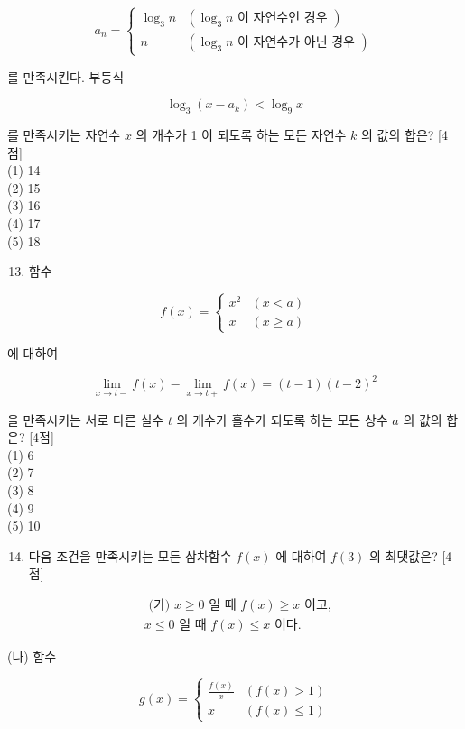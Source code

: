 \documentclass[10pt]{article}
\begin{document}
\[
a_{n}= \begin{cases}\log _{3} n & \left(\log _{3} n \text { 이 자연수인 경우 }\right) \\ n & \left(\log _{3} n \text { 이 자연수가 아닌 경우 }\right)\end{cases}
\]

를 만족시킨다. 부등식

\[
\log _{3}\left(x-a_{k}\right)<\log _{9} x
\]

를 만족시키는 자연수 $x$ 의 개수가 1 이 되도록 하는 모든 자연수 $k$ 의 값의 합은? [4점]\\
(1) 14\\
(2) 15\\
(3) 16\\
(4) 17\\
(5) 18

\begin{enumerate}
  \setcounter{enumi}{12}
  \item 함수
\end{enumerate}

\[
f(x)= \begin{cases}x^{2} & (x<a) \\ x & (x \geq a)\end{cases}
\]

에 대하여

\[
\lim _{x \rightarrow t-} f(x)-\lim _{x \rightarrow t+} f(x)=(t-1)(t-2)^{2}
\]

을 만족시키는 서로 다른 실수 $t$ 의 개수가 홀수가 되도록 하는 모든 상수 $a$ 의 값의 합은? [4점]\\
(1) 6\\
(2) 7\\
(3) 8\\
(4) 9\\
(5) 10

\begin{enumerate}
  \setcounter{enumi}{13}
  \item 다음 조건을 만족시키는 모든 삼차함수 $f(x)$ 에 대하여 $f(3)$ 의 최댓값은? [4점]
\end{enumerate}

\[
\begin{aligned}
& \text { (가) } x \geq 0 \text { 일 때 } f(x) \geq x \text { 이고, } \\
& x \leq 0 \text { 일 때 } f(x) \leq x \text { 이다. }
\end{aligned}
\]

(나) 함수

\[
g(x)= \begin{cases}\frac{f(x)}{x} & (f(x)>1) \\ x & (f(x) \leq 1)\end{cases}
\]
\end{document}
